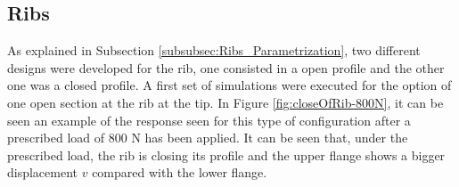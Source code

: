   \clearpage
  \subsection{Ribs} \label{subsec:ribs_results_model}

    As explained in Subsection \ref{subsubsec:Ribs_Parametrization}, two different designs were developed for the rib, one consisted in a open profile and the other one was a closed profile. A first set of simulations were executed for the option of one open section at the rib at the tip. In Figure \ref{fig:closeOfRib-800N}, it can be seen an example of the response seen for this type of configuration after a prescribed load of 800 N has been applied. It can be seen that, under the prescribed load, the rib is closing its profile and the upper flange shows a bigger displacement $v$ compared with the lower flange.

